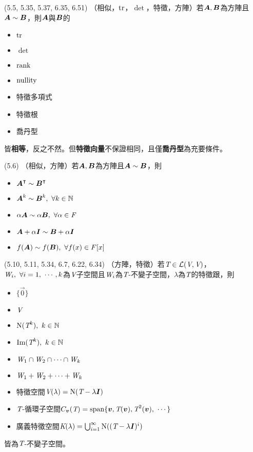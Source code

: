 \item \begin{theorem}{(5.5, 5.35, 5.37, 6.35, 6.51)} （相似，$\operatorname{tr}$，$\det$，特徵，方陣）若$\boldsymbol{A}, \boldsymbol{B}$為方陣且$\boldsymbol{A} \sim \boldsymbol{B}$，則$\boldsymbol{A}$與$\boldsymbol{B}$的
	\begin{itemize}
		\item $\operatorname{tr}$
		\item $\det$
		\item $\operatorname{rank}$
		\item $\operatorname{nullity}$
		\item 特徵多項式
		\item 特徵根
		\item 喬丹型
	\end{itemize}
	皆\textbf{相等}，反之不然。但\textbf{特徵向量}不保證相同，且僅\textbf{喬丹型}為充要條件。
\end{theorem}

\item \begin{theorem}{(5.6)} （相似，方陣）若$\boldsymbol{A}, \boldsymbol{B}$為方陣且$\boldsymbol{A} \sim \boldsymbol{B}$，則
	\begin{itemize}
		\item $\boldsymbol{A}^\intercal \sim \boldsymbol{B}^\intercal$
		\item $\boldsymbol{A}^k \sim \boldsymbol{B}^k, \ \forall k \in \mathbb{N}$
		\item $\alpha\mat{A} \sim \alpha\mat{B}, \ \forall \alpha \in \F$
		\item $\boldsymbol{A} + \alpha \boldsymbol{I} \sim \boldsymbol{B} + \alpha \boldsymbol{I}$
		\item $f(\boldsymbol{A}) \sim f(\boldsymbol{B}), \ \forall f(x) \in F[x]$
	\end{itemize}
\end{theorem}

\item \begin{theorem}{(5.10, 5.11, 5.34, 6.7, 6.22, 6.34)} （方陣，特徵）若$\textit{T} \in \mathcal{L}(\textit{V}, \textit{V})$，$\spc{W}_i, \ \forall i = 1, \ \cdots, k$為$\textit{V}$子空間且$\textit{W}_i$為$\textit{T}$-不變子空間，$\lambda$為$\textit{T}$的特徵跟，則
	\begin{itemize}
		\item $\{\vec{0}\}$
		\item $\textit{V}$
		\item $\operatorname{N}(\textit{T}^k), \ k \in \mathbb{N}$
		\item $\operatorname{Im}(\textit{T}^k), \ k \in \mathbb{N}$
		\item $\textit{W}_1 \cap \textit{W}_2 \cap \cdots \cap \textit{W}_k$
		\item $\textit{W}_1 + \textit{W}_2 + \cdots + \textit{W}_k$
		\item 特徵空間$\textit{V}(\lambda) = \operatorname{N}(\textit{T} - \lambda\boldsymbol{I})$
		\item $\textit{T}$-循環子空間$C_{\boldsymbol{v}}(\textit{T}) = \operatorname{span}\{\boldsymbol{v}, \textit{T}(\boldsymbol{v}), \textit{T}^2(\boldsymbol{v}), \ \cdots\}$
		\item 廣義特徵空間$\textit{K}(\lambda) = \bigcup_{i = 1}^{\infty}\operatorname{N}((\textit{T} - \lambda\boldsymbol{I})^i)$
	\end{itemize}
	皆為$\textit{T}$-不變子空間。
\end{theorem}

